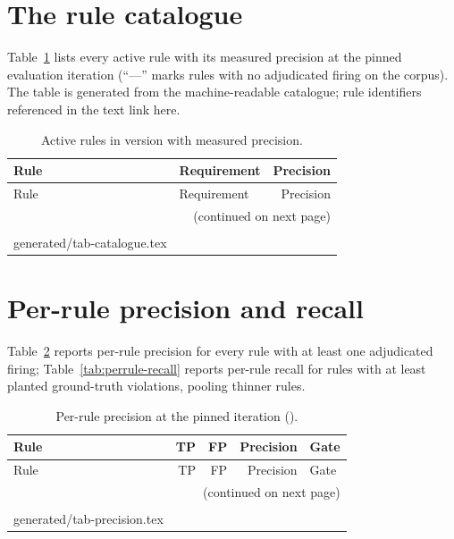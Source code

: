 \documentclass[nojss,article]{jss}
\makeatletter
\newcommand{\rawinput}[1]{\@@input #1 }
\makeatother
\begin{document}


\newpage
\begin{appendix}

\section{The rule catalogue}
\label{app:catalogue}

Table~\ref{tab:catalogue} lists every active rule with its measured
precision at the pinned evaluation iteration (``---'' marks rules
with no adjudicated firing on the corpus). The table is generated
from the machine-readable catalogue; rule identifiers referenced in
the text link here.

\begin{longtable}{p{}p{}r}
\toprule
Rule & Requirement & Precision \\
\midrule
\endfirsthead
\toprule
Rule & Requirement & Precision \\
\midrule
\endhead
\midrule
\multicolumn{3}{r}{(continued on next page)}\\
\endfoot
\bottomrule
\caption{Active rules in version \StatToolVersion{} with measured
  precision.}\label{tab:catalogue}\\
\endlastfoot
\rawinput{generated/tab-catalogue.tex}
\end{longtable}

\section{Per-rule precision and recall}
\label{app:perrule}

Table~\ref{tab:perrule-precision} reports per-rule precision for
every rule with at least one adjudicated firing;
Table~\ref{tab:perrule-recall} reports per-rule recall for rules
with at least \StatRecallMinPlants{} planted ground-truth violations,
pooling thinner rules.

\begin{longtable}{lrrrl}
\toprule
Rule & TP & FP & Precision & Gate \\
\midrule
\endfirsthead
\toprule
Rule & TP & FP & Precision & Gate \\
\midrule
\endhead
\midrule
\multicolumn{5}{r}{(continued on next page)}\\
\endfoot
\bottomrule
\caption{Per-rule precision at the pinned iteration
  (\code{\StatPinnedIteration}).}\label{tab:perrule-precision}\\
\endlastfoot
\rawinput{generated/tab-precision.tex}
\end{longtable}


\end{appendix}
\end{document}
